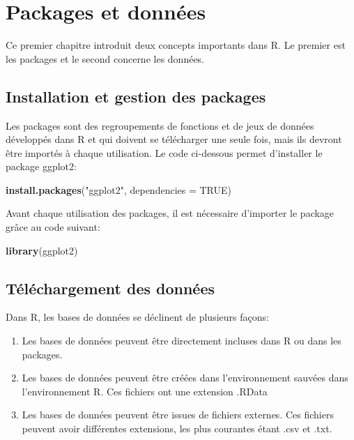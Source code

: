 \documentclass[
]{book}
\newenvironment{Shaded}{\begin{snugshade}}{\end{snugshade}}
\newcommand{\AttributeTok}[1]{\textcolor[rgb]{0.13,0.29,0.53}{#1}}
\newcommand{\ConstantTok}[1]{\textcolor[rgb]{0.56,0.35,0.01}{#1}}
\newcommand{\FunctionTok}[1]{\textcolor[rgb]{0.13,0.29,0.53}{\textbf{#1}}}
\newcommand{\NormalTok}[1]{#1}
\newcommand{\StringTok}[1]{\textcolor[rgb]{0.31,0.60,0.02}{#1}}
\providecommand{\tightlist}{%
  \setlength{\itemsep}{0pt}\setlength{\parskip}{0pt}}
\begin{document}
\chapter{Packages et données}\label{packages-et-donnuxe9es}

Ce premier chapitre introduit deux concepts importants dans R. Le premier est les packages et le second concerne les données.

\section{Installation et gestion des packages}\label{installation-et-gestion-des-packages}

Les packages sont des regroupements de fonctions et de jeux de données développés dans R et qui doivent se télécharger une seule fois, mais ils devront être importés à chaque utilisation. Le code ci-dessous permet d'installer le package ggplot2:

\begin{Shaded}
\begin{Highlighting}[]
\FunctionTok{install.packages}\NormalTok{(}\StringTok{"ggplot2"}\NormalTok{, }\AttributeTok{dependencies =} \ConstantTok{TRUE}\NormalTok{)}
\end{Highlighting}
\end{Shaded}

Avant chaque utilisation des packages, il est nécessaire d'importer le package grâce au code suivant:

\begin{Shaded}
\begin{Highlighting}[]
\FunctionTok{library}\NormalTok{(ggplot2)}
\end{Highlighting}
\end{Shaded}

\section{Téléchargement des données}\label{tuxe9luxe9chargement-des-donnuxe9es}

Dans R, les bases de données se déclinent de plusieurs façons:

\begin{enumerate}
\def\labelenumi{\arabic{enumi}.}
\tightlist
\item
  Les bases de données peuvent être directement incluses dans R ou dans les packages.
\item
  Les bases de données peuvent être créées dans l'environnement sauvées dans l'environnement R. Ces fichiers ont une extension .RData
\item
  Les bases de données peuvent être issues de fichiers externes. Ces fichiers peuvent avoir différentes extensions, les plus courantes étant .csv et .txt.
\end{enumerate}
\end{document}
